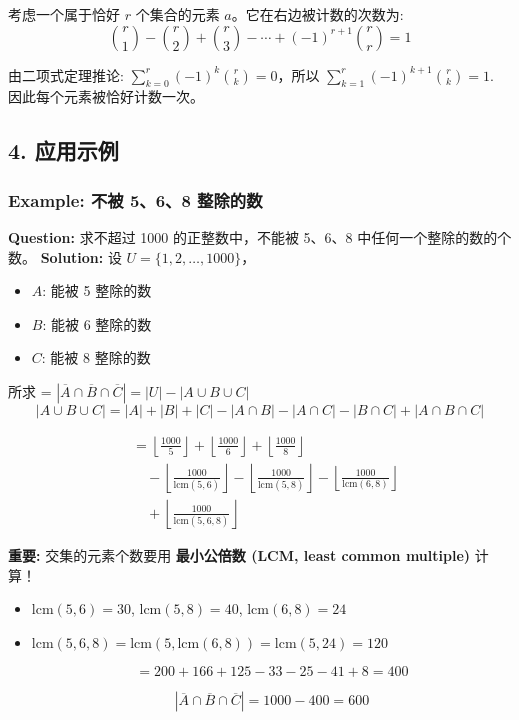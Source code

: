 \documentclass[10pt,a4paper,openany]{ctexbook}
\theoremstyle{definition}
\theoremstyle{remark}
\begin{document}
考虑一个属于恰好 $r$ 个集合的元素 $a$。它在右边被计数的次数为:
\[
\binom{r}{1} - \binom{r}{2} + \binom{r}{3} - \cdots + (-1)^{r+1}\binom{r}{r} = 1
\]

由二项式定理推论: $\sum_{k=0}^r (-1)^k \binom{r}{k} = 0$，所以 $\sum_{k=1}^r (-1)^{k+1} \binom{r}{k} = 1$.
因此每个元素被恰好计数一次。
\vspace{-2pt}

\subsection{4. 应用示例}

\subsubsection{Example: 不被 5、6、8 整除的数}

\textbf{Question:} 求不超过 1000 的正整数中，不能被 5、6、8 中任何一个整除的数的个数。
\textbf{Solution:}
设 $U = \{1,2,\dots,1000\}$，
\begin{itemize}
\item $A$: 能被 5 整除的数
\item $B$: 能被 6 整除的数
\item $C$: 能被 8 整除的数

\end{itemize}

所求 = $|\overline{A} \cap \overline{B} \cap \overline{C}| = |U| - |A \cup B \cup C|$
\[
|A \cup B \cup C| = |A| + |B| + |C| - |A \cap B| - |A \cap C| - |B \cap C| + |A \cap B \cap C|
\]

\[
\begin{aligned}
&= \left\lfloor\frac{1000}{5}\right\rfloor + \left\lfloor\frac{1000}{6}\right\rfloor + \left\lfloor\frac{1000}{8}\right\rfloor \\
&\quad - \left\lfloor\frac{1000}{\text{lcm}(5,6)}\right\rfloor - \left\lfloor\frac{1000}{\text{lcm}(5,8)}\right\rfloor - \left\lfloor\frac{1000}{\text{lcm}(6,8)}\right\rfloor \\
&\quad + \left\lfloor\frac{1000}{\text{lcm}(5,6,8)}\right\rfloor
\end{aligned}
\]

\textbf{重要:} 交集的元素个数要用 \textbf{最小公倍数 (LCM, least common multiple)} 计算！
\begin{itemize}
\item $\text{lcm}(5,6) = 30$, $\text{lcm}(5,8) = 40$, $\text{lcm}(6,8) = 24$
\item $\text{lcm}(5,6,8) = \text{lcm}(5, \text{lcm}(6,8)) = \text{lcm}(5,24) = 120$

\[
= 200 + 166 + 125 - 33 - 25 - 41 + 8 = 400
\]


\[
|\overline{A} \cap \overline{B} \cap \overline{C}| = 1000 - 400 = 600
\]


\end{itemize}
\end{document}
